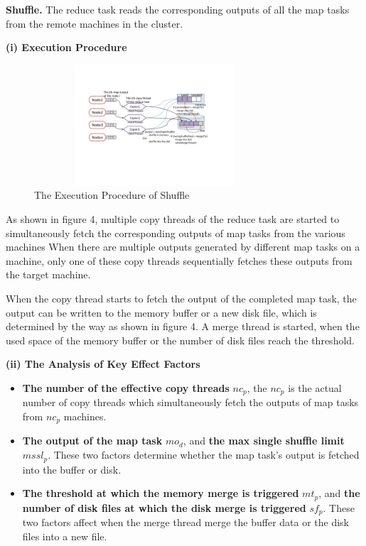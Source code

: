 \noindent\textbf{Shuffle.} The reduce task reads the corresponding outputs of all the map tasks from the remote machines in the cluster.

\noindent\textbf{(i) Execution Procedure}
\begin{figure}[htbp]
\centering
\includegraphics[height=4.5cm, width=9cm]{shuffle}
\caption{The Execution Procedure of Shuffle}
\end{figure}

As shown in figure 4, multiple copy threads of the reduce task are started to simultaneously fetch the corresponding outputs of map tasks from the various machines When there are multiple outputs generated by different map tasks on a machine, only one of these copy threads sequentially fetches these outputs from the target machine.

When the copy thread starts to fetch the output of the completed map task, the output can be written to the memory buffer or a new disk file, which
is determined by the way as shown in figure 4. A merge thread is started, when the used space of the memory buffer or the number of disk files reach the threshold.

\noindent\textbf{(ii) The Analysis of Key Effect Factors}
\begin{itemize}
\item \textbf{The number of the effective copy threads} $nc_p$, the $nc_p$ is the actual number of copy threads which simultaneously fetch the outputs of map tasks from $nc_p$ machines.
\item \textbf{The output of the map task} $mo_d$, and \textbf{the max single shuffle limit} $mssl_p$. These two factors determine whether the map task's output is fetched into the buffer or disk.
\item \textbf{The threshold at which the memory merge is triggered} $mt_p$, and \textbf{the number of disk files at which the disk merge is triggered} $sf_p$. These two factors affect when the merge thread merge the buffer data or the disk files into a new file.
\end{itemize}

